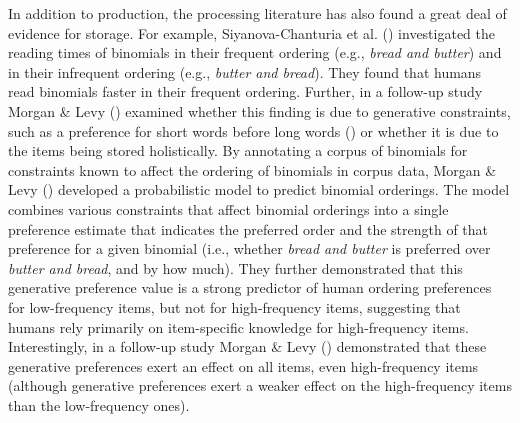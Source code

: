 \documentclass[
  12pt,
  letterpaper,
]{scrreport}
\begin{document}
In addition to production, the processing literature has also found a
great deal of evidence for storage. For example, Siyanova-Chanturia et
al. ()
investigated the reading times of binomials in their frequent ordering
(e.g., \emph{bread and butter}) and in their infrequent ordering (e.g.,
\emph{butter and bread}). They found that humans read binomials faster
in their frequent ordering. Further, in a follow-up study Morgan \& Levy
() examined
whether this finding is due to generative constraints, such as a
preference for short words before long words
()
or whether it is due to the items being stored holistically. By
annotating a corpus of binomials for constraints known to affect the
ordering of binomials in corpus data, Morgan \& Levy
() developed a
probabilistic model to predict binomial orderings. The model combines
various constraints that affect binomial orderings into a single
preference estimate that indicates the preferred order and the strength
of that preference for a given binomial (i.e., whether \emph{bread and
butter} is preferred over \emph{butter and bread}, and by how much).
They further demonstrated that this generative preference value is a
strong predictor of human ordering preferences for low-frequency items,
but not for high-frequency items, suggesting that humans rely primarily
on item-specific knowledge for high-frequency items. Interestingly, in a
follow-up study Morgan \& Levy ()
demonstrated that these generative preferences exert an effect on all
items, even high-frequency items (although generative preferences exert
a weaker effect on the high-frequency items than the low-frequency
ones).
\end{document}
